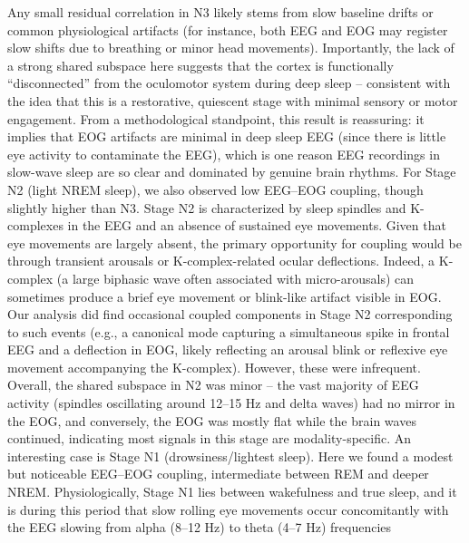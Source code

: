 Any small residual correlation in N3 likely stems from slow baseline drifts or common physiological artifacts (for instance, both EEG and EOG may register slow shifts due to breathing or minor head movements). Importantly, the lack of a strong shared subspace here suggests that the cortex is functionally “disconnected” from the oculomotor system during deep sleep – consistent with the idea that this is a restorative, quiescent stage with minimal sensory or motor engagement. From a methodological standpoint, this result is reassuring: it implies that EOG artifacts are minimal in deep sleep EEG (since there is little eye activity to contaminate the EEG), which is one reason EEG recordings in slow-wave sleep are so clear and dominated by genuine brain rhythms. For Stage N2 (light NREM sleep), we also observed low EEG–EOG coupling, though slightly higher than N3. Stage N2 is characterized by sleep spindles and K-complexes in the EEG and an absence of sustained eye movements. Given that eye movements are largely absent, the primary opportunity for coupling would be through transient arousals or K-complex-related ocular deflections. Indeed, a K-complex (a large biphasic wave often associated with micro-arousals) can sometimes produce a brief eye movement or blink-like artifact visible in EOG. Our analysis did find occasional coupled components in Stage N2 corresponding to such events (e.g., a canonical mode capturing a simultaneous spike in frontal EEG and a deflection in EOG, likely reflecting an arousal blink or reflexive eye movement accompanying the K-complex). However, these were infrequent. Overall, the shared subspace in N2 was minor – the vast majority of EEG activity (spindles oscillating around 12–15 Hz and delta waves) had no mirror in the EOG, and conversely, the EOG was mostly flat while the brain waves continued, indicating most signals in this stage are modality-specific. An interesting case is Stage N1 (drowsiness/lightest sleep). Here we found a modest but noticeable EEG–EOG coupling, intermediate between REM and deeper NREM. Physiologically, Stage N1 lies between wakefulness and true sleep, and it is during this period that slow rolling eye movements occur concomitantly with the EEG slowing from alpha (8–12 Hz) to theta (4–7 Hz) frequencies %

